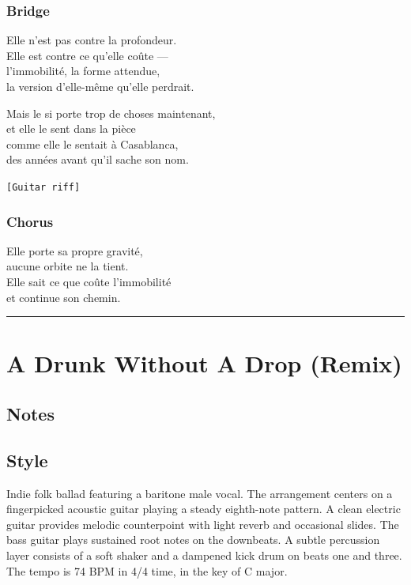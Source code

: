 \documentclass[]{article}
\begin{document}
\subsubsection{Bridge}\label{bridge-2}

Elle n'est pas contre la profondeur.\\
Elle est contre ce qu'elle coûte ---\\
l'immobilité, la forme attendue,\\
la version d'elle-même qu'elle perdrait.

Mais le si porte trop de choses maintenant,\\
et elle le sent dans la pièce\\
comme elle le sentait à Casablanca,\\
des années avant qu'il sache son nom.

\texttt{{[}Guitar\ riff{]}}

\subsubsection{Chorus}\label{chorus-10}

Elle porte sa propre gravité,\\
aucune orbite ne la tient.\\
Elle sait ce que coûte l'immobilité\\
et continue son chemin.

\begin{center}\rule{0.5\linewidth}{0.5pt}\end{center}

\section{A Drunk Without A Drop
(Remix)}\label{a-drunk-without-a-drop-remix}

\subsection{Notes}\label{notes-11}

\subsection{Style}\label{style-11}

Indie folk ballad featuring a baritone male vocal. The arrangement
centers on a fingerpicked acoustic guitar playing a steady eighth-note
pattern. A clean electric guitar provides melodic counterpoint with
light reverb and occasional slides. The bass guitar plays sustained root
notes on the downbeats. A subtle percussion layer consists of a soft
shaker and a dampened kick drum on beats one and three. The tempo is 74
BPM in 4/4 time, in the key of C major.
\end{document}
